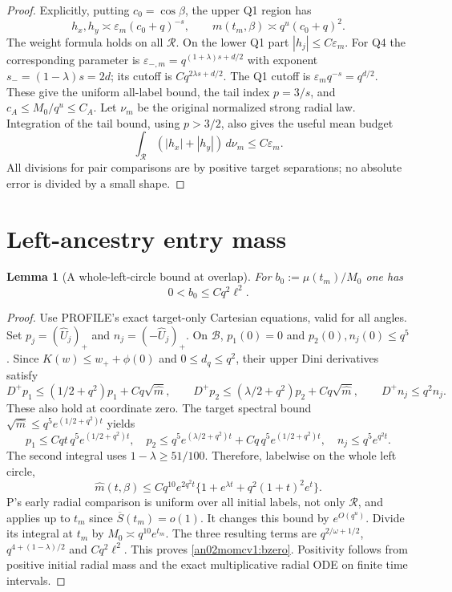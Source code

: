 \documentclass[11pt]{article}
\newtheorem{lemma}[theorem]{Lemma}
\theoremstyle{remark}\newtheorem{remark}[theorem]{Remark}
\newcommand{\dd}{\,d}
\newcommand{\Rhalf}{\mathcal R}
\newcommand{\Lhalf}{\mathcal B}
\newcommand{\eps}{\varepsilon}
\begin{document}
\begin{proof}
Explicitly, putting $c_0=\cos\beta$, the upper Q1 region has
\begin{equation}\label{an02momcv1:entryprofile}
 h_x,h_y\asymp \eps_m(c_0+q)^{-s},\qquad
 m(t_m,\beta)\asymp q^u(c_0+q)^2 .
\end{equation}
The weight formula holds on all $\Rhalf$. On the lower Q1 part
$|h_j|\le C\eps_m$. For Q4 the corresponding parameter is
$\eps_{-,m}=q^{(1+\lambda)s+d/2}$ with exponent
$s_-=(1-\lambda)s=2d$; its cutoff is
$Cq^{2\lambda s+d/2}$.
The Q1 cutoff is $\eps_mq^{-s}=q^{d/2}$.
These give the uniform all-label bound, the tail index $p=3/s$,
and $c_A\le M_0/q^u\le C_A$.
Let $\nu_m$ be the original normalized strong radial law. Integration
of the tail bound, using $p>3/2$, also gives the useful mean budget
\begin{equation}\label{an02momcv1:entrymoment}
 \int_{\Rhalf}(|h_x|+|h_y|)\dd\nu_m\le C\eps_m .
\end{equation}
All divisions for pair comparisons are by positive target
separations; no absolute error is divided by a small shape.
\end{proof}

\section{Left-ancestry entry mass}
\begin{lemma}[A whole-left-circle bound at overlap]
\label{an02momcv1:leftentry}
For $b_0:=\mu(t_m)/M_0$ one has
\begin{equation}\label{an02momcv1:bzero}
 0<b_0\le Cq^2\ell^2 .
\end{equation}
\end{lemma}
\begin{proof}
Use PROFILE's exact target-only Cartesian equations, valid for all
angles. Set $p_j=(\widehat U_j)_+$ and
$n_j=(-\widehat U_j)_+$. On $\Lhalf$, $p_1(0)=0$ and
$p_2(0),n_j(0)\le q^5$. Since $K(w)\le w_++\phi(0)$ and
$0\le d_q\le q^2$, their upper Dini derivatives satisfy
\[
 D^+p_1\le(1/2+q^2)p_1+Cq\sqrt{\widehat m},\qquad
 D^+p_2\le(\lambda/2+q^2)p_2+Cq\sqrt{\widehat m},\qquad
 D^+n_j\le q^2 n_j .
\]
These also hold at coordinate zero. The target spectral bound
$\sqrt{\widehat m}\le q^5e^{(1/2+q^2)t}$ yields
\[
 p_1\le Cqt\,q^5e^{(1/2+q^2)t},\quad
 p_2\le q^5e^{(\lambda/2+q^2)t}
          +Cq\,q^5e^{(1/2+q^2)t},\quad
 n_j\le q^5e^{q^2t}.
\]
The second integral uses $1-\lambda\ge51/100$.
Therefore, labelwise on the whole left circle,
\begin{equation}\label{an02momcv1:lefttarget}
 \widehat m(t,\beta)\le
 Cq^{10}e^{2q^2t}\{1+e^{\lambda t}
                     +q^2(1+t)^2e^t\}.
\end{equation}
P's early radial comparison is uniform over all initial labels,
not only $\Rhalf$, and applies up to $t_m$ since
$\overline S(t_m)=o(1)$. It changes this bound by $e^{O(q^u)}$.
Divide its integral at $t_m$ by $M_0\asymp q^{10}e^{t_m}$.
The three resulting terms are
$q^{2/\omega+1/2}$,
$q^{4+(1-\lambda)/2}$ and $Cq^2\ell^2$.
This proves \eqref{an02momcv1:bzero}. Positivity follows from
positive initial radial mass and the exact multiplicative radial
ODE on finite time intervals.
\end{proof}
\end{document}
